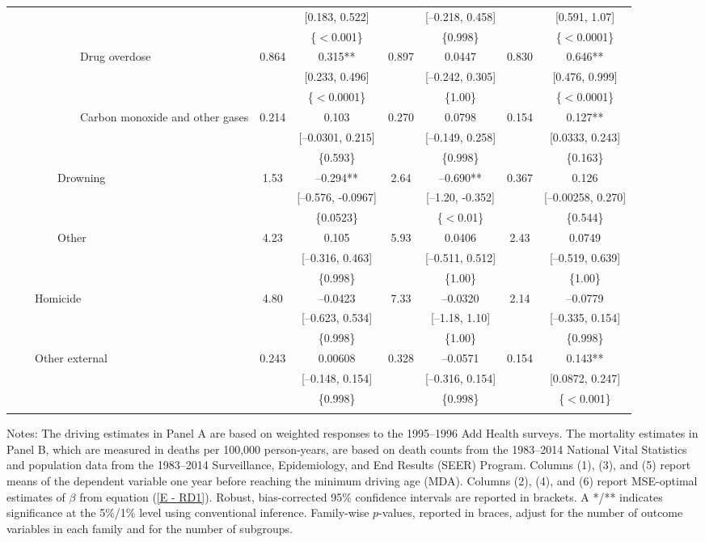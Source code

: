 \documentclass{article}
\begin{document}
\begin{table}[tbp]
{\begin{tabularx}{\linewidth}{lCcCcCc}
&&[0.183, 0.522]&&[--0.218, 0.458]&&[0.591, 1.07] \tabularnewline
&&\{\(<\)0.001\}&&\{0.998\}&&\{\(<\)0.0001\} \tabularnewline
\addlinespace[1ex] \ \ \ \ \ \ \ \ \ \ \ \ Drug overdose&0.864&0.315**&0.897&0.0447&0.830&0.646** \tabularnewline
&&[0.233, 0.496]&&[--0.242, 0.305]&&[0.476, 0.999] \tabularnewline
&&\{\(<\)0.0001\}&&\{1.00\}&&\{\(<\)0.0001\} \tabularnewline
\addlinespace[1ex] \ \ \ \ \ \ \ \ \ \ \ \ Carbon monoxide and other gases&0.214&0.103&0.270&0.0798&0.154&0.127** \tabularnewline
&&[--0.0301, 0.215]&&[--0.149, 0.258]&&[0.0333, 0.243] \tabularnewline
&&\{0.593\}&&\{0.998\}&&\{0.163\} \tabularnewline
\addlinespace[1ex] \ \ \ \ \ \ \ \ Drowning&1.53&--0.294**&2.64&--0.690**&0.367&0.126 \tabularnewline
&&[--0.576, -0.0967]&&[--1.20, -0.352]&&[--0.00258, 0.270] \tabularnewline
&&\{0.0523\}&&\{\(<\)0.01\}&&\{0.544\} \tabularnewline
\addlinespace[1ex] \ \ \ \ \ \ \ \ Other&4.23&0.105&5.93&0.0406&2.43&0.0749 \tabularnewline
&&[--0.316, 0.463]&&[--0.511, 0.512]&&[--0.519, 0.639] \tabularnewline
&&\{0.998\}&&\{1.00\}&&\{1.00\} \tabularnewline
\addlinespace[1ex] \ \ \ \ Homicide&4.80&--0.0423&7.33&--0.0320&2.14&--0.0779 \tabularnewline
&&[--0.623, 0.534]&&[--1.18, 1.10]&&[--0.335, 0.154] \tabularnewline
&&\{0.998\}&&\{1.00\}&&\{0.998\} \tabularnewline
\addlinespace[1ex] \ \ \ \ Other external&0.243&0.00608&0.328&--0.0571&0.154&0.143** \tabularnewline
&&[--0.148, 0.154]&&[--0.316, 0.154]&&[0.0872, 0.247] \tabularnewline
&&\{0.998\}&&\{0.998\}&&\{\(<\)0.001\} \tabularnewline
\bottomrule \addlinespace[\belowrulesep]

\end{tabularx}
\begin{flushleft}
\scriptsize Notes: The driving estimates in Panel A are based on weighted responses to the 1995--1996 Add Health surveys. The mortality estimates in Panel B, which are measured in deaths per 100,000 person-years, are based on death counts from the 1983--2014 National Vital Statistics and population data from the 1983--2014 Surveillance, Epidemiology, and End Results (SEER) Program.  Columns (1), (3), and (5) report means of the dependent variable one year before reaching the minimum driving age (MDA). Columns (2), (4), and (6) report MSE-optimal estimates of \(\beta\) from equation (\ref{E - RD1}). Robust, bias-corrected 95\% confidence intervals are reported in brackets. A */** indicates significance at the 5\%/1\% level using conventional inference. Family-wise \(p\)-values, reported in braces, adjust for the number of outcome variables in each family and for the number of subgroups.
\end{flushleft}
}
\end{table}
\end{document}
